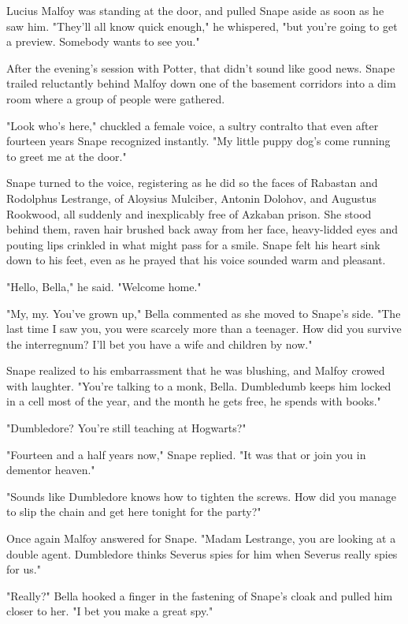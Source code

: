 Lucius Malfoy was standing at the door, and pulled Snape aside as soon as he saw him. "They'll all know quick enough," he whispered, "but you're going to get a preview. Somebody wants to see you."

After the evening's session with Potter, that didn't sound like good news. Snape trailed reluctantly behind Malfoy down one of the basement corridors into a dim room where a group of people were gathered.

"Look who's here," chuckled a female voice, a sultry contralto that even after fourteen years Snape recognized instantly. "My little puppy dog's come running to greet me at the door."

Snape turned to the voice, registering as he did so the faces of Rabastan and Rodolphus Lestrange, of Aloysius Mulciber, Antonin Dolohov, and Augustus Rookwood, all suddenly and inexplicably free of Azkaban prison. She stood behind them, raven hair brushed back away from her face, heavy-lidded eyes and pouting lips crinkled in what might pass for a smile. Snape felt his heart sink down to his feet, even as he prayed that his voice sounded warm and pleasant.

"Hello, Bella," he said. "Welcome home."

"My, my. You've grown up," Bella commented as she moved to Snape's side. "The last time I saw you, you were scarcely more than a teenager. How did you survive the interregnum? I'll bet you have a wife and children by now."

Snape realized to his embarrassment that he was blushing, and Malfoy crowed with laughter. "You're talking to a monk, Bella. Dumbledumb keeps him locked in a cell most of the year, and the month he gets free, he spends with books."

"Dumbledore? You're still teaching at Hogwarts?"

"Fourteen and a half years now," Snape replied. "It was that or join you in dementor heaven."

"Sounds like Dumbledore knows how to tighten the screws. How did you manage to slip the chain and get here tonight for the party?"

Once again Malfoy answered for Snape. "Madam Lestrange, you are looking at a double agent. Dumbledore thinks Severus spies for him when Severus really spies for us."

"Really?" Bella hooked a finger in the fastening of Snape's cloak and pulled him closer to her. "I bet you make a great spy."

